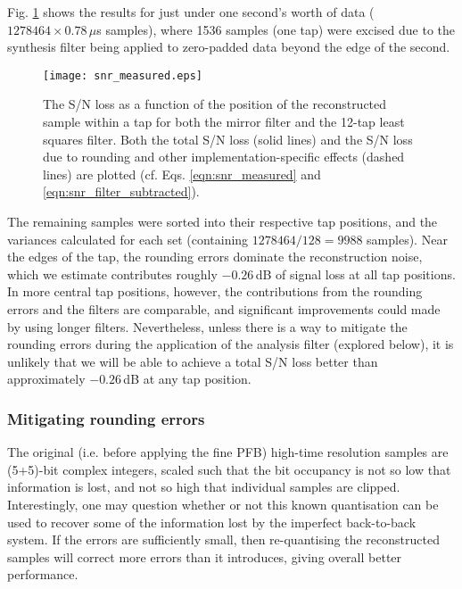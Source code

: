 \documentclass{pasa}%
\begin{document}
Fig. \ref{fig:snr_measured} shows the results for just under one second's worth of data ($1278464 \times 0.78\,\mu$s samples), where 1536 samples (one tap) were excised due to the synthesis filter being applied to zero-padded data beyond the edge of the second.
\begin{figure}
    \centering
    \texttt{[image: snr\_measured.eps]}
    \caption{The S/N loss as a function of the position of the reconstructed sample within a tap for both the mirror filter and the 12-tap least squares filter. Both the total S/N loss (solid lines) and the S/N loss due to rounding and other implementation-specific effects (dashed lines) are plotted (cf. Eqs. \eqref{eqn:snr_measured} and \eqref{eqn:snr_filter_subtracted}).}
    \label{fig:snr_measured}
\end{figure}
The remaining samples were sorted into their respective tap positions, and the variances calculated for each set (containing $1278464/128 = 9988$ samples).
Near the edges of the tap, the rounding errors dominate the reconstruction noise, which we estimate contributes roughly $-0.26\,$dB of signal loss at all tap positions.
In more central tap positions, however, the contributions from the rounding errors and the filters are comparable, and significant improvements could made by using longer filters.
Nevertheless, unless there is a way to mitigate the rounding errors during the application of the analysis filter (explored below), it is unlikely that we will be able to achieve a total S/N loss better than approximately $-0.26\,$dB at any tap position.

\subsubsection{Mitigating rounding errors}

The original (i.e. before applying the fine PFB) high-time resolution samples are (5+5)-bit complex integers, scaled such that the bit occupancy is not so low that information is lost, and not so high that individual samples are clipped.
Interestingly, one may question whether or not this known quantisation can be used to recover some of the information lost by the imperfect back-to-back system.
If the errors are sufficiently small, then re-quantising the reconstructed samples will correct more errors than it introduces, giving overall better performance.
\end{document}
